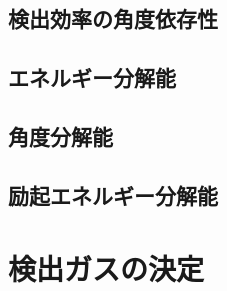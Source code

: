 \subsection{検出効率の角度依存性}
\subsection{エネルギー分解能}
\subsection{角度分解能}
\subsection{励起エネルギー分解能}

\section{検出ガスの決定}
